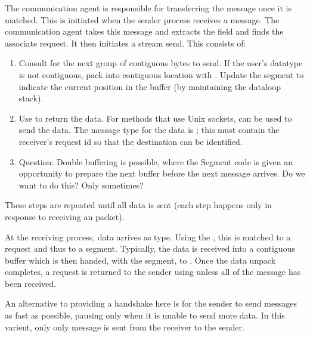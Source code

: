\begin{mmadi}
\begin{tcp}
The communication agent is responsible for transferring the message once it is
matched.  This is initiated when the sender process receives a
 message.
The communication agent takes this message and extracts the
 field and finds the associate
request.  It then initiates a stream send.  This consists of:
\begin{enumerate}
\item Consult  for the next group of contiguous bytes
  to send.  If the user's datatype is not contiguous, pack into contiguous
  location with .  Update the segment to indicate the
  current position in the buffer (by maintaining the dataloop stack). 

\item Use  to return the data.  For methods that use Unix
  sockets,  can be used to send the data.  The
  message type for the data is ; this must contain
  the receiver's request id so that the destination can be identified.

\item Question:  Double buffering is possible, where the Segment code is given
  an opportunity to prepare the next buffer before the next
   message arrives.  Do we want to do this?
  Only sometimes?

\end{enumerate}
These steps are repeated until all data is sent (each step happens only in
response to receiving an  packet).

At the receiving process, data arrives as  type.  
Using the , this is matched to a request
and thus to a segment.  Typically, the data is received into a contiguous
buffer which is then handed, with the segment, to .
Once the data unpack completes, a  request is
returned to the sender using  unless all of the message
has been received.

An alternative to providing a handshake here is for the sender to send
 messages as fast as possible, pausing only when it
is unable to send more data.  In this varient, only only
 message is sent from the receiver to the
sender. 

\end{tcp}


\end{mmadi}
